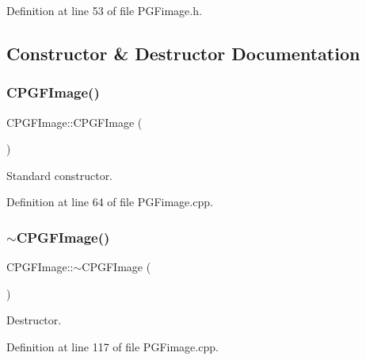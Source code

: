Definition at line 53 of file P\+G\+Fimage.\+h.



\subsection{Constructor \& Destructor Documentation}
\mbox{\label{classCPGFImage_af98838248d4bb5e0b2e89e2cd31b4b71}} 
\subsubsection{\texorpdfstring{CPGFImage()}{CPGFImage()}}
{\footnotesize\ttfamily C\+P\+G\+F\+Image\+::\+C\+P\+G\+F\+Image (\begin{DoxyParamCaption}{ }\end{DoxyParamCaption})}



Standard constructor. 



Definition at line 64 of file P\+G\+Fimage.\+cpp.


\begin{DoxyCode}{0}

\end{DoxyCode}
\mbox{\label{classCPGFImage_a1bdfdce118d4a7c9167154b5ff0bb670}} 
\subsubsection{\texorpdfstring{$\sim$CPGFImage()}{~CPGFImage()}}
{\footnotesize\ttfamily C\+P\+G\+F\+Image\+::$\sim$\+C\+P\+G\+F\+Image (\begin{DoxyParamCaption}{ }\end{DoxyParamCaption})\hspace{0.3cm}{\ttfamily [virtual]}}



Destructor. 



Definition at line 117 of file P\+G\+Fimage.\+cpp.


